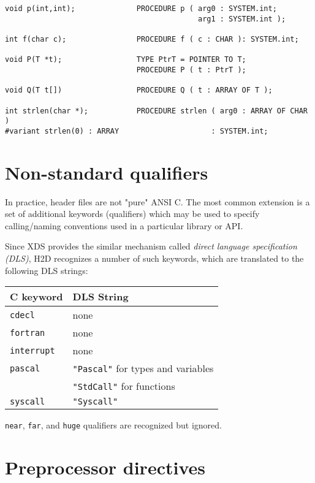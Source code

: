 {\ifonline\else\small\fi
\begin{verbatim}
void p(int,int);              PROCEDURE p ( arg0 : SYSTEM.int;
                                            arg1 : SYSTEM.int );

int f(char c);                PROCEDURE f ( c : CHAR ): SYSTEM.int;

void P(T *t);                 TYPE PtrT = POINTER TO T;
                              PROCEDURE P ( t : PtrT );

void Q(T t[])                 PROCEDURE Q ( t : ARRAY OF T );

int strlen(char *);           PROCEDURE strlen ( arg0 : ARRAY OF CHAR )
#variant strlen(0) : ARRAY                     : SYSTEM.int;

\end{verbatim}
} %

\section{Non-standard qualifiers}
\label{rules:qualifiers}

In practice, header files are not "pure" ANSI C. The most common
extension is a set of additional keywords (qualifiers) which may be used to
specify calling/naming conventions used in a particular library or API.

Since XDS provides the similar mechanism called {\em direct language
specification (DLS)}, H2D recognizes a number of such keywords, which are
translated to the following DLS strings:

\begin{center}
\begin{tabular}{ll}
\bf C keyword & \bf DLS String \\
\hline
\tt cdecl     & none \\
\tt fortran   & none \\      %
\tt interrupt & none \\      %
\tt pascal    & {\tt "Pascal"} for types and variables \\
              & {\tt "StdCall"} for functions \\ %
\tt syscall   & \tt "Syscall" \\
\end{tabular}
\end{center}

{\tt near}, {\tt far}, and {\tt huge} qualifiers are recognized but
ignored.

\section{Preprocessor directives}
\label{rules:pp}

